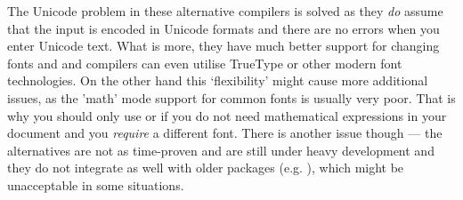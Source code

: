 \documentclass[
]{scrartcl}
\begin{document}
%
The Unicode problem in these alternative compilers is solved as they \emph{do}
    assume that the input is encoded in Unicode formats and there are no errors
    when you enter Unicode text.
%
What is more, they have much better support for changing fonts and 
    and  compilers can even utilise TrueType or other modern font
    technologies.
%
On the other hand this `flexibility' might cause more additional issues, as
    the 'math' mode support for common fonts is usually very poor.
%
That is why you should only use  or  if you do not
    need mathematical expressions in your document and you \emph{require} a
    different font.
%
There is another issue though --- the alternatives are not as time-proven and
    are still under heavy development and they do not integrate as well with
    older packages (e.g.  ), which might be unacceptable in some
    situations.
\end{document}
